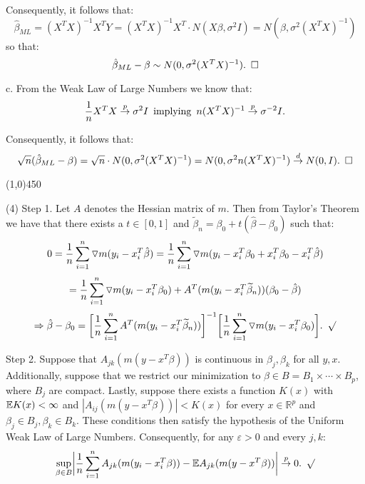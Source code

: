 \documentclass[12pt]{article}
\begin{document}
\noindent
Consequently, it follows that:
$$\hat{\beta}_{ML} = (X^TX)^{-1}X^TY = (X^TX)^{-1}X^T \cdot N(X\beta,\sigma^2 I) = N(\beta, \sigma^2 (X^TX)^{-1})$$
so that:
$$\hat{\beta}_{ML}-\beta \sim N(0, \sigma^2 (X^TX)^{-1}). \hspace{5 pt} \square$$

\noindent
c. From the Weak Law of Large Numbers we know that:
$$\frac{1}{n}X^TX \overset{p}\to \sigma^2 I \hspace{5 pt}
{\rm implying} \hspace{5 pt}  n (X^TX)^{-1} \overset{p}\to \sigma^{-2} I.$$

\noindent
Consequently, it follows that:
$$\sqrt{n} (\hat{\beta}_{ML}-\beta) 
= \sqrt{n}\cdot N(0,\sigma^2 (X^TX)^{-1}) 
= N(0,\sigma^2 n (X^TX)^{-1})
 \overset{d}\to N(0,I). \hspace{5 pt} \square$$
 
\begin{center}
\line(1,0){450}
\end{center}

\pagebreak
\noindent
(4) Step 1. Let $A$ denotes the Hessian matrix of $m$. Then from Taylor's Theorem we have that there exists a $t\in[0,1]$ and $\widetilde\beta_n =  \beta_0+t(\hat{\beta}-\beta_0)$ such that:
$$0 = \frac{1}{n}\sum_{i=1}^n \triangledown m(y_i-x_i^T \hat{\beta})
= \frac{1}{n}\sum_{i=1}^n \triangledown m(y_i-x_i^T\beta_0+x_i^T\beta_0-x_i^T\hat{\beta})$$
$$= \frac{1}{n}\sum_{i=1}^n \triangledown m(y_i-x_i^T\beta_0)+A^T(m(y_i-x_i^T\widetilde\beta_n)) (\beta_0-\hat{\beta}) $$
$$\Rightarrow \hat{\beta}-\beta_0 = \biggl[ \frac{1}{n} \sum_{i=1}^n A^T(m(y_i-x_i^T\widetilde\beta_n)) \biggr]^{-1}
\biggl[ \frac{1}{n}\sum_{i=1}^n \triangledown m(y_i-x_i^T\beta_0) \biggr]. \hspace{5 pt} \surd$$

\noindent
Step 2. Suppose that $A_{jk}(m(y-x^T\beta))$ is continuous in $\beta_j,\beta_k$ for all $y,x$. Additionally, suppose that we restrict our minimization to $\beta \in B = B_1 \times \cdots \times B_p$, where $B_j$ are compact. Lastly, suppose there exists a function $K(x)$ with $\mathbb{E} K(x) < \infty$ and $|A_{ij}(m(y-x^T\beta))| < K(x)$ for every $x\in\mathbb{R}^p$ and $\beta_j \in B_j,\beta_k\in B_k$. These conditions then satisfy the hypothesis of the Uniform Weak Law of Large Numbers. Consequently, for any $\varepsilon>0$ and every $j,k$:
$$\sup_{\beta\in B} \biggl|\frac{1}{n} \sum_{i=1}^n A_{jk} (m(y_i-x_i^T\beta)) - \mathbb{E} A_{jk}(m(y-x^T\beta)) \biggr| \overset{p}\to 0. \hspace{5 pt} \surd$$
\end{document}
